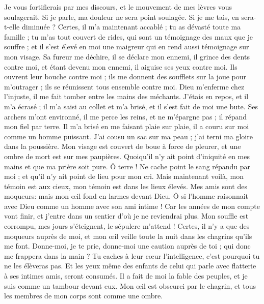 \begin{multicols}{2}
Je vous fortifierais par mes discours, et le mouvement de mes lèvres vous soulagerait.
Si je parle, ma douleur ne sera point soulagée. Si je me tais, en sera-t-elle diminuée ?
Certes, il m'a maintenant accablé ; tu as dévasté toute ma famille ; 
tu m'as tout couvert de rides, qui sont un témoignage des maux que je souffre ; et il s'est élevé en moi une maigreur qui en rend aussi témoignage sur mon visage. 
Sa fureur me déchire, il se déclare mon ennemi, il grince des dents contre moi, et étant devenu mon ennemi, il aiguise ses yeux contre moi.
Ils ouvrent leur bouche contre moi ; ils me donnent des soufflets sur la joue pour m'outrager ; ils se réunissent tous ensemble contre moi. 
Dieu m'enferme chez l'injuste, il me fait tomber entre les mains des méchants. 
J'étais en repos, et il m'a écrasé ; il m'a saisi au collet et m'a brisé, et il s'est fait de moi une bute.
Ses archers m'ont environné, il me perce les reins, et ne m'épargne pas ; il répand mon fiel par terre. 
Il m'a brisé en me faisant plaie sur plaie, il a couru sur moi comme un homme puissant.
J'ai cousu un sac sur ma peau ; j'ai terni ma gloire dans la poussière.
Mon visage est couvert de boue à force de pleurer, et une ombre de mort est sur mes paupières. 
Quoiqu'il n'y ait point d'iniquité en mes mains et que ma prière soit pure.
Ô terre ! Ne cache point le sang répandu par moi ; et qu'il n'y ait point de lieu pour mon cri.
Mais maintenant voilà, mon témoin est aux cieux, mon témoin est dans les lieux élevés.
Mes amis sont des moqueurs: mais mon œil fond en larmes devant Dieu.
Ô si l'homme raisonnait avec Dieu comme un homme avec son ami intime ! 
Car les années de mon compte vont finir, et j'entre dans un sentier d'où je ne reviendrai plus. 
\VerseOne{}Mon souffle est corrompu, mes jours s'éteignent, le sépulcre m'attend !
Certes, il n'y a que des moqueurs auprès de moi, et mon œil veille toute la nuit dans les chagrins qu'ils me font.
Donne-moi, je te prie, donne-moi une caution auprès de toi ; qui donc me frappera dans la main ?
Tu caches à leur cœur l'intelligence, c'est pourquoi tu ne les élèveras pas.
Et les yeux même des enfants de celui qui parle avec flatterie à ses intimes amis, seront consumés.
Il a fait de moi la fable des peuples, et je suis comme un tambour devant eux.
Mon œil est obscurci par le chagrin, et tous les membres de mon corps sont comme une ombre.

\end{multicols}
